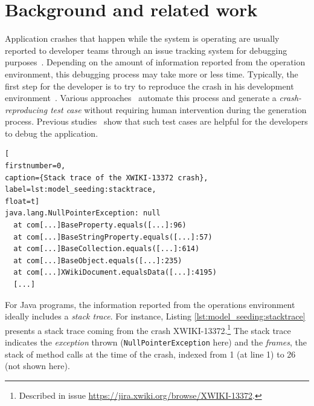 
\section{Background and related work}\label{sec:model_seeding:background}


Application crashes that happen while the system is operating are usually reported to developer teams through an issue tracking system for debugging purposes~\cite{DBLP:conf/iwpc/WhiteVJBP15}. Depending on the amount of information reported from the operation environment, this debugging process may take more or less time. Typically, the first step for the developer is to try to reproduce the crash in his development environment~\cite{Zeller2009}. Various approaches~\cite{Chen2015, Nayrolles2017, Xuan2015, BPT17concrash, soltani2017} automate this process and generate a \emph{crash-reproducing test case} without requiring human intervention during the generation process.  Previous studies~\cite{Chen2015,Soltani2018a} show that such test cases are helpful for the developers to debug the application.

\begin{lstlisting}[
firstnumber=0,
caption={Stack trace of the XWIKI-13372 crash},
label=lst:model_seeding:stacktrace,
float=t]
java.lang.NullPointerException: null
  at com[...]BaseProperty.equals([...]:96)
  at com[...]BaseStringProperty.equals([...]:57)
  at com[...]BaseCollection.equals([...]:614)
  at com[...]BaseObject.equals([...]:235)
  at com[...]XWikiDocument.equalsData([...]:4195)
  [...]
\end{lstlisting}

For Java programs, the information reported from the operations environment ideally includes a \emph{stack trace}. For instance, Listing \ref{lst:model_seeding:stacktrace} presents a stack trace coming from the crash XWIKI-13372.\footnote{Described in  issue \url{https://jira.xwiki.org/browse/XWIKI-13372}.} The stack trace indicates the \emph{exception} thrown (\texttt{Null\-Pointer\-Exception} here) and the \emph{frames}, \ie the stack of method calls at the time of the crash, indexed from 1 (at line 1) to 26 (not shown here).


